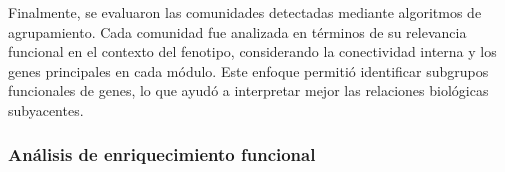 Finalmente, se evaluaron las comunidades detectadas mediante algoritmos de agrupamiento. Cada comunidad fue analizada en términos de su relevancia funcional en el contexto del fenotipo, considerando la conectividad interna y los genes principales en cada módulo. Este enfoque permitió identificar subgrupos funcionales de genes, lo que ayudó a interpretar mejor las relaciones biológicas subyacentes.

\subsubsection{\textbf{Análisis de enriquecimiento funcional}}






